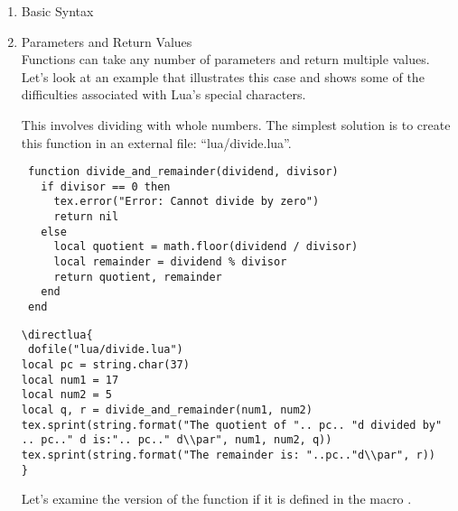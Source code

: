  \begin{enumerate}[label=(\alph*)]
  \item Basic Syntax

\begin{tkzexample}[latex=.4\textwidth]
\end{tkzexample}

\item Parameters and Return Values\\

Functions can take any number of parameters and return multiple values. Let's look at an example that illustrates this case and shows some of the difficulties associated with Lua's special characters.

This involves dividing with whole numbers. The simplest solution
is to create this function in an external file: “lua/divide.lua”.

\begin{mybox}
\begin{verbatim}
 function divide_and_remainder(dividend, divisor)
   if divisor == 0 then
     tex.error("Error: Cannot divide by zero")
     return nil
   else
     local quotient = math.floor(dividend / divisor)
     local remainder = dividend % divisor
     return quotient, remainder
   end
 end
\end{verbatim}
\end{mybox}

\begin{verbatim}
\directlua{
 dofile("lua/divide.lua")
local pc = string.char(37)
local num1 = 17
local num2 = 5
local q, r = divide_and_remainder(num1, num2)
tex.sprint(string.format("The quotient of ".. pc.. "d divided by"
.. pc.." d is:".. pc.." d\\par", num1, num2, q))
tex.sprint(string.format("The remainder is: "..pc.."d\\par", r))
}
\end{verbatim}


Let's examine the version of the function if it is defined in the macro .


\end{enumerate}
